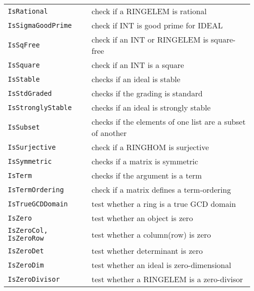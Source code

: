 \documentclass[a4paper]{mybook}
\begin{document}
\begin{center}
\begin{longtable}{ll}
{\verb~IsRational~} &
      check if a RINGELEM is rational\\
   
{\verb~IsSigmaGoodPrime~} &
      check if INT is good prime for IDEAL \\
   
{\verb~IsSqFree~} &
      check if an INT or RINGELEM is square-free\\
   
{\verb~IsSquare~} &
      check if an INT is a square\\
   
{\verb~IsStable~} &
      checks if an ideal is stable\\
   
{\verb~IsStdGraded~} &
      checks if the grading is standard\\
   
{\verb~IsStronglyStable~} &
      checks if an ideal is strongly stable\\
   
{\verb~IsSubset~} &
      checks if the elements of one list are a subset of another\\
   
{\verb~IsSurjective~} &
      check if a RINGHOM is surjective\\
   
{\verb~IsSymmetric~} &
      checks if a matrix is symmetric\\
   
{\verb~IsTerm~} &
      checks if the argument is a term\\
   
{\verb~IsTermOrdering~} &
      check if a matrix defines a term-ordering\\
   
{\verb~IsTrueGCDDomain~} &
      test whether a ring is a true GCD domain\\
   
{\verb~IsZero~} &
      test whether an object is zero\\
   
{\verb~IsZeroCol, IsZeroRow~} &
      test whether a column(row) is zero\\
   
{\verb~IsZeroDet~} &
      test whether determinant is zero\\
   
{\verb~IsZeroDim~} &
      test whether an ideal is zero-dimensional\\
   
{\verb~IsZeroDivisor~} &
      test whether a RINGELEM is a zero-divisor\\
   

\end{longtable}
\end{center}
\end{document}
